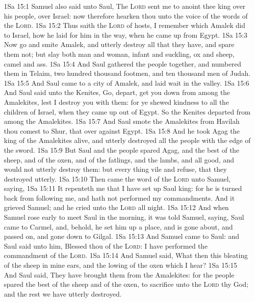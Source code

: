 \vs 1Sa 15:1 Samuel also said unto Saul, The \textsc{Lord} sent me to anoint thee  king over his people, over Israel: now therefore hearken thou unto the voice of the words of the \textsc{Lord}.
\vs 1Sa 15:2 Thus saith the \textsc{Lord} of hosts, I remember  which Amalek did to Israel, how he laid  for him in the way, when he came up from Egypt.
\vs 1Sa 15:3 Now go and smite Amalek, and utterly destroy all that they have, and spare them not; but slay both man and woman, infant and suckling, ox and sheep, camel and ass.
\vs 1Sa 15:4 And Saul gathered the people together, and numbered them in Telaim, two hundred thousand footmen, and ten thousand men of Judah.
\vs 1Sa 15:5 And Saul came to a city of Amalek, and laid wait in the valley.
\vs 1Sa 15:6 And Saul said unto the Kenites, Go, depart, get you down from among the Amalekites, lest I destroy you with them: for ye shewed kindness to all the children of Israel, when they came up out of Egypt. So the Kenites departed from among the Amalekites.
\vs 1Sa 15:7 And Saul smote the Amalekites from Havilah  thou comest to Shur, that  over against Egypt.
\vs 1Sa 15:8 And he took Agag the king of the Amalekites alive, and utterly destroyed all the people with the edge of the sword.
\vs 1Sa 15:9 But Saul and the people spared Agag, and the best of the sheep, and of the oxen, and of the fatlings, and the lambs, and all  good, and would not utterly destroy them: but every thing  vile and refuse, that they destroyed utterly.
\vs 1Sa 15:10 Then came the word of the \textsc{Lord} unto Samuel, saying,
\vs 1Sa 15:11 It repenteth me that I have set up Saul  king: for he is turned back from following me, and hath not performed my commandments. And it grieved Samuel; and he cried unto the \textsc{Lord} all night.
\vs 1Sa 15:12 And when Samuel rose early to meet Saul in the morning, it was told Samuel, saying, Saul came to Carmel, and, behold, he set him up a place, and is gone about, and passed on, and gone down to Gilgal.
\vs 1Sa 15:13 And Samuel came to Saul: and Saul said unto him, Blessed  thou of the \textsc{Lord}: I have performed the commandment of the \textsc{Lord}.
\vs 1Sa 15:14 And Samuel said, What  then this bleating of the sheep in mine ears, and the lowing of the oxen which I hear?
\vs 1Sa 15:15 And Saul said, They have brought them from the Amalekites: for the people spared the best of the sheep and of the oxen, to sacrifice unto the \textsc{Lord} thy God; and the rest we have utterly destroyed.
